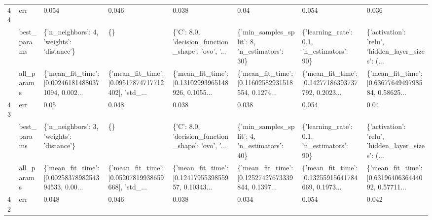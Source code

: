 \begin{tabular}{llllllll}
44 & err &                                              0.054 &                                              0.046 &                                              0.038 &                                               0.04 &                                              0.054 &                                              0.036 \\
   & best\_params &          \{'n\_neighbors': 4, 'weights': 'distance'\} &                                                 \{\} &  \{'C': 8.0, 'decision\_function\_shape': 'ovo', '... &       \{'min\_samples\_split': 8, 'n\_estimators': 30\} &         \{'learning\_rate': 0.1, 'n\_estimators': 90\} &  \{'activation': 'relu', 'hidden\_layer\_sizes': (... \\
   & all\_params &  \{'mean\_fit\_time': [0.002461814880371094, 0.002... &  \{'mean\_fit\_time': [0.09517874717712402], 'std\_... &  \{'mean\_fit\_time': [0.13102993965148926, 0.1055... &  \{'mean\_fit\_time': [0.11602582931518554, 0.1274... &  \{'mean\_fit\_time': [0.14277186393737792, 0.2023... &  \{'mean\_fit\_time': [0.6367764949798584, 0.58625... \\
43 & err &                                               0.05 &                                              0.048 &                                              0.038 &                                              0.038 &                                              0.054 &                                               0.04 \\
   & best\_params &          \{'n\_neighbors': 3, 'weights': 'distance'\} &                                                 \{\} &  \{'C': 8.0, 'decision\_function\_shape': 'ovo', '... &       \{'min\_samples\_split': 4, 'n\_estimators': 40\} &         \{'learning\_rate': 0.1, 'n\_estimators': 90\} &  \{'activation': 'relu', 'hidden\_layer\_sizes': (... \\
   & all\_params &  \{'mean\_fit\_time': [0.0025837898254394533, 0.00... &  \{'mean\_fit\_time': [0.05207819938659668], 'std\_... &  \{'mean\_fit\_time': [0.1241795539855957, 0.10343... &  \{'mean\_fit\_time': [0.12527427673339844, 0.1397... &  \{'mean\_fit\_time': [0.13255915641784669, 0.1973... &  \{'mean\_fit\_time': [0.6319640636444092, 0.57711... \\
42 & err &                                              0.048 &                                              0.046 &                                              0.038 &                                              0.034 &                                              0.054 &                                              0.042 \\

\end{tabular}
